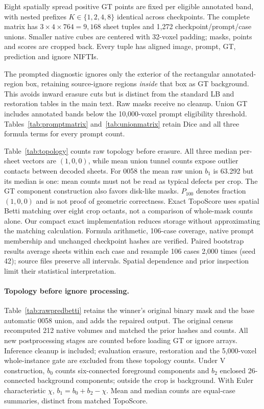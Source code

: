 Eight spatially spread positive GT points are fixed per eligible annotated
band, with nested prefixes $K\in\{1,2,4,8\}$ identical across checkpoints.
The complete matrix has $3\times4\times764=9,168$ sheet tuples and 1,272
checkpoint/prompt/case unions. Smaller native cubes are centered with
32-voxel padding; masks, points and scores are cropped back. Every tuple has
aligned image, prompt, GT, prediction and ignore NIFTIs.

The prompted diagnostic ignores only the exterior of the rectangular
annotated-region box, retaining source-ignore regions \emph{inside} that box
as GT background. This avoids inward erasure cuts but is distinct from the
standard LB and restoration tables in the main text. Raw masks receive no
cleanup. Union GT includes annotated bands below the 10,000-voxel prompt
eligibility threshold. Tables~\ref{tab:promptmatrix} and~\ref{tab:unionmatrix}
retain Dice and all three formula terms for every prompt count.





Table~\ref{tab:topology} counts raw topology before erasure. All three median
per-sheet vectors are $(1,0,0)$, while mean union tunnel counts expose outlier
contacts between decoded sheets. For 0058 the mean raw union $b_1$ is 63.292
but its median is one: mean counts must not be read as typical defects per
crop. The GT component construction also favors disk-like masks.
$P_{100}$ denotes fraction $(1,0,0)$ and is not proof of geometric correctness.
Exact TopoScore uses spatial Betti matching over eight crop octants, not a
comparison of whole-mask counts alone.
Our compact exact implementation reduces storage without approximating the
matching calculation. Formula arithmetic, 106-case coverage, native prompt
membership and unchanged checkpoint hashes are verified. Paired bootstrap
results average sheets within each case and resample 106 cases 2,000 times
(seed 42); source files preserve all intervals. Spatial dependence and prior
inspection limit their statistical interpretation.

\paragraph{Topology before ignore processing.}
Table~\ref{tab:rawpredbetti} retains the winner's original binary mask and the
base automatic 0058 union, and adds the repaired output. The original census
recomputed 212 native volumes and matched the prior hashes and counts.
All new postprocessing stages are counted before loading GT or ignore arrays.
Inference cleanup is included; evaluation erasure, restoration and the
5,000-voxel whole-instance gate are excluded from these topology counts.
Under V construction, $b_0$ counts six-connected foreground components and
$b_2$ enclosed 26-connected background components; outside the crop is
background. With Euler characteristic $\chi$, $b_1=b_0+b_2-\chi$.
Mean and median counts are equal-case summaries, distinct from matched TopoScore.

